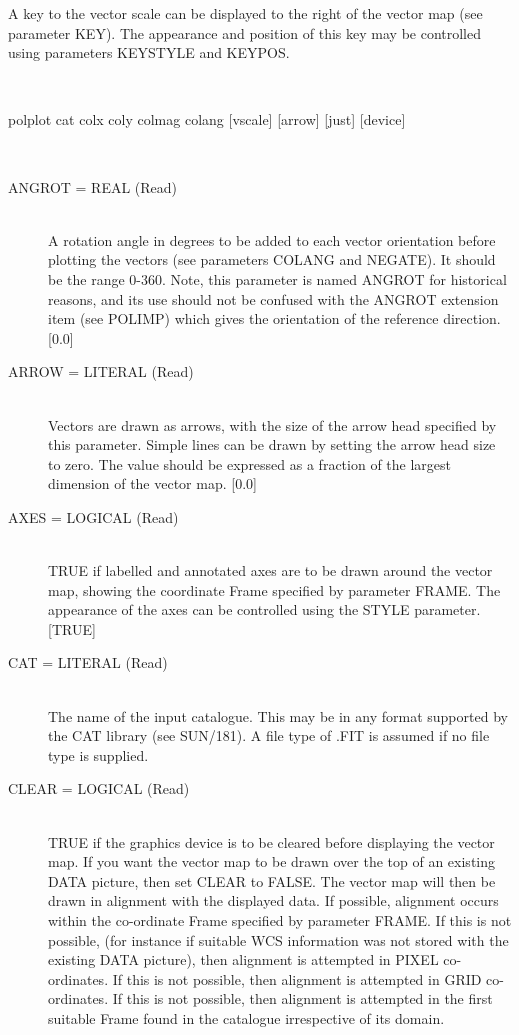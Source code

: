 \documentclass[twoside,11pt]{article}
\newcommand{\xref}[3]{#1}
\renewcommand{\_}{\texttt{\symbol{95}}}
\newcommand{\sstusage}[1]{\item[Usage:] \mbox{}
\\[1.3ex]{\raggedright \ssttt #1}}
\newcommand{\sstparameters}[1]{
   \item[Parameters:] \mbox{} \\
   \vspace{-3.5ex}
   \begin{description}
      #1
   \end{description}
}
\newcommand{\sstsubsection}[1]{ \item[{#1}] \mbox{} \\}
\newcommand{\sstusage}[1]{\item[Usage:]
      \begin{description}
         {\ssttt #1}
      \end{description}
      \\
   }
\newcommand{\sstparameters}[1]{
      \item[Parameters:] \\
      \begin{description}
         #1
      \end{description}
      \\
   }
\newcommand{\sstsubsection}[1]{\item[{#1}]}
\begin{document}
{{      A key to the vector scale can be displayed to the right of the
      vector map (see parameter KEY). The appearance and position of this
      key may be controlled using parameters KEYSTYLE and KEYPOS.
   }
   \sstusage{
      polplot cat colx coly colmag colang [vscale] [arrow] [just] [device]
   }
   \sstparameters{
      \sstsubsection{
         ANGROT = \_REAL (Read)
      }{
         A rotation angle in degrees to be added to each vector orientation 
         before plotting the vectors (see parameters COLANG and NEGATE). It 
         should be the range 0-360. Note, this parameter is named ANGROT
         for historical reasons, and its use should not be confused with
         the ANGROT extension item (see POLIMP) which gives the orientation 
         of the reference direction. [0.0]
      }
      \sstsubsection{
         ARROW = LITERAL (Read)
      }{
         Vectors are drawn as arrows, with the size of the arrow head
         specified by this parameter. Simple lines can be drawn by setting
         the arrow head size to zero. The value should be expressed as a
         fraction of the largest dimension of the vector map. [0.0]
      }
      \sstsubsection{
         AXES = \_LOGICAL (Read)
      }{
         TRUE if labelled and annotated axes are to be drawn around the
         vector map, showing the coordinate Frame specified by parameter
         FRAME. The appearance of the axes can be controlled using
         the STYLE parameter. [TRUE]
      }
      \sstsubsection{
         CAT = LITERAL (Read)
      }{
         The name of the input catalogue. This may be in any format
         supported by the CAT library (see \xref{SUN/181}{sun181}{}). A file type of .FIT
         is assumed if no file type is supplied.
      }
      \sstsubsection{
         CLEAR = \_LOGICAL (Read)
      }{
         TRUE if the graphics device is to be cleared before displaying
         the vector map. If you want the vector map to be drawn over
         the top of an existing DATA picture, then set CLEAR to FALSE. The
         vector map will then be drawn in alignment with the displayed
         data. If possible, alignment occurs within the co-ordinate Frame
         specified by parameter FRAME. If this is not possible, (for instance
         if suitable WCS information was not stored with the existing DATA
         picture), then alignment is attempted in PIXEL co-ordinates. If this
         is not possible, then alignment is attempted in GRID co-ordinates. If
         this is not possible, then alignment is attempted in the first
         suitable Frame found in the catalogue irrespective of its domain.
}}}
\end{document}
